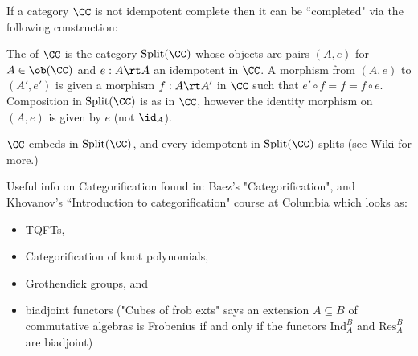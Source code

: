 \nt If a category $\CC$ is not idempotent complete then it can be ``completed" via the following construction:
\begin{definition}\label{karoubi_def} The  of $\CC$ is the category $\text{Split}(\CC)$ whose objects are pairs $(A,e)$ for $A\in \ob(\CC)$ and $e:A\rt A$ an idempotent in $\CC$. A morphism from $(A,e)$ to $(A',e')$ is given a morphism $f:A\rt A'$ in $\CC$ such that $e'\circ f=f=f\circ e$. Composition in $\text{Split}(\CC)$ is as in $\CC$, however the identity morphism on $(A,e)$ is given by $e$ (not $\id_A$). 
\end{definition}

\nt $\CC$ embeds in $\text{Split}(\CC)$, and every idempotent in $\text{Split}(\CC)$ splits (see \hyperlink{https://en.wikipedia.org/wiki/Karoubi_envelope}{Wiki} for more.)\bb

\nt Useful info on Categorification found in: Baez's "Categorification", and Khovanov's ``Introduction to categorification" course at Columbia which looks as: 
\begin{itemize}
  \item TQFTs, 
  \item Categorification of knot polynomials, 
  \item Grothendiek groups, and 
  \item biadjoint functors ("Cubes of frob exts" says an extension $A\subseteq B$ of commutative algebras is Frobenius if and only if the functors $\text{Ind}^B_A$ and $\text{Res}^B_A$ are biadjoint)
\end{itemize}

